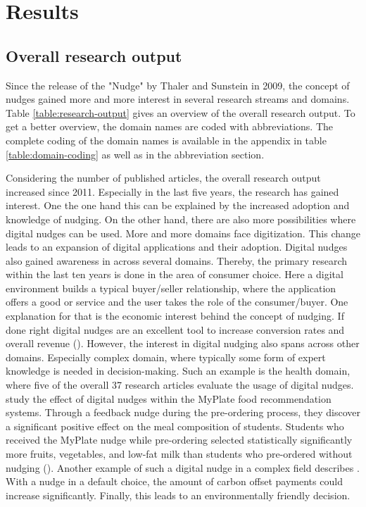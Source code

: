 \section{Results}

\subsection{Overall research output}
Since the release of the "Nudge" by Thaler and Sunstein in 2009, the concept of nudges gained more and more interest in several research streams and domains. Table \ref{table:research-output} gives an overview of the overall research output. To get a better overview, the domain names are coded with abbreviations. The complete coding of the domain names is available in the appendix in table \ref{table:domain-coding} as well as in the abbreviation section.

Considering the number of published articles, the overall research output increased since 2011. Especially in the last five years, the research has gained interest. One the one hand this can be explained by the increased adoption and knowledge of nudging. On the other hand, there are also more possibilities where digital nudges can be used. More and more domains face digitization. This change leads to an expansion of digital applications and their adoption. %
Digital nudges also gained awareness in across several domains. Thereby, the primary research within the last ten years is done in the area of consumer choice. Here a digital environment builds a typical buyer/seller relationship, where the application offers a good or service and the user takes the role of the consumer/buyer. One explanation for that is the economic interest behind the concept of nudging. If done right digital nudges are an excellent tool to increase conversion rates and overall revenue (\cite{mirsch_making_2018}).
However, the interest in digital nudging also spans across other domains. Especially complex domain, where typically some form of expert knowledge is needed in decision-making. Such an example is the health domain, where five of the overall 37 research articles evaluate the usage of digital nudges. \cite{miller_effects_2016} study the effect of digital nudges within the MyPlate food recommendation systems. Through a feedback nudge during the pre-ordering process, they discover a significant positive effect on the meal composition of students. Students who received the MyPlate nudge while pre-ordering selected statistically significantly more fruits, vegetables, and low-fat milk than students who pre-ordered without nudging (\cite{miller_effects_2016}).
Another example of such a digital nudge in a complex field describes \cite{szekely_nudging_2016}. With a nudge in a default choice, the amount of carbon offset payments could increase significantly. Finally, this leads to an environmentally friendly decision.


